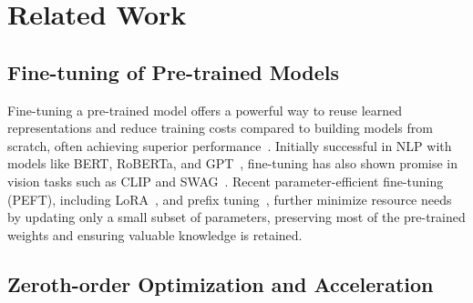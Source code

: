 \section{Related Work}
\subsection{Fine-tuning of Pre-trained Models}


Fine-tuning a pre-trained model offers a powerful way to reuse learned representations and reduce training costs compared to building models from scratch, often achieving superior performance~\cite{gururangan2020don,ouyang2022training}. Initially successful in NLP with models like BERT, RoBERTa, and GPT~\cite{devlin2018bert,liu2019roberta,chen2022visualgpt}, fine-tuning has also shown promise in vision tasks such as CLIP and SWAG~\cite{radford2021learning,singh2022revisiting}. Recent parameter-efficient fine-tuning (PEFT), including LoRA~\cite{hu2021lora}, and prefix tuning~\cite{li2021prefix}, further minimize resource needs by updating only a small subset of parameters, preserving most of the pre-trained weights and ensuring valuable knowledge is retained.

\subsection{Zeroth-order Optimization and Acceleration}

